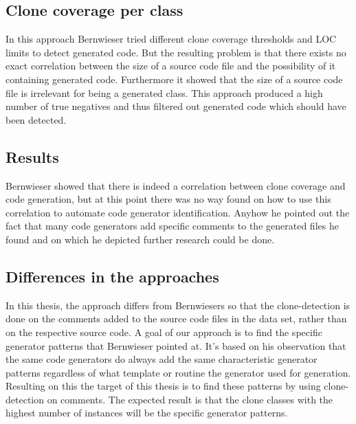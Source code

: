 \subsection{Clone coverage per class}
In this approach Bernwieser tried different clone coverage thresholds and LOC limits to detect generated code. But the resulting problem is that there exists no exact correlation between the size of a source code file and the possibility of it containing generated code. Furthermore it showed that the size of a source code file is irrelevant for being a generated class. This approach produced a high number of true negatives and thus filtered out generated code which should have been detected.

\subsection{Results}
Bernwieser showed that there is indeed a correlation between clone coverage and code generation, but at this point there was no way found on how to use this correlation to automate code generator identification. Anyhow he pointed out the fact that many code generators add specific comments to the generated files he found and on which he depicted further research could be done.

\subsection{Differences in the approaches}
In this thesis, the approach differs from Bernwiesers so that the clone-detection is done on the comments added to the source code files in the data set, rather than on the respective source code. A goal of our approach is to find the specific generator patterns that Bernwieser pointed at. It's based on his observation that the same code generators do always add the same characteristic generator patterns regardless of what template or routine the generator used for generation. Resulting on this the target of this thesis is to find these patterns by using clone-detection on comments. The expected result is that the clone classes with the highest number of instances will be the specific generator patterns.

